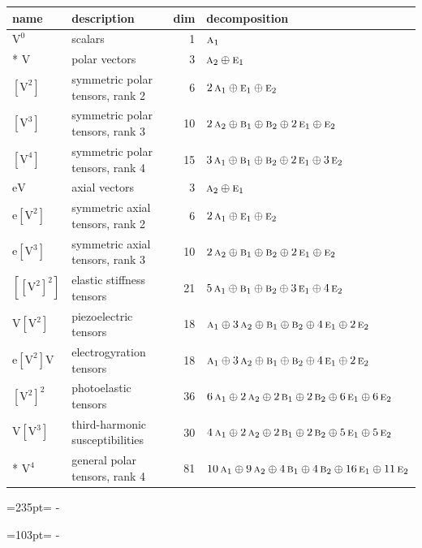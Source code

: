 \documentclass[10pt,a4paper]{article}
\newcommand{\needspace}[1]{\par\penalty-100\begingroup\dimen0=#1\relax\dimen2=\pagegoal
  \advance\dimen2-\pagetotal\ifdim\dimen0>\dimen2\relax\ifdim\dimen2>0pt\vfil\break\fi\fi
  \endgroup}
\numberwithin{equation}{section}
\newcommand{\irr}[1]{\text{\normalfont\scshape #1}}
\newcommand{\jahn}[1]{\mathrm{#1}}
\newlength{\fillwidth}\newlength{\cellwidth}\newlength{\colwidth}
\begin{document}
{\begin{longtable}{@{}llr>{\RaggedRight\arraybackslash}p{\fillwidth}@{}}
name & description & dim & decomposition\\\midrule\endhead
\bottomrule\endfoot\endlastfoot
$\jahn{V^{0}}$ & scalars & 1 & $\irr{a}_{1}$\\*
$\jahn{V}$ & polar vectors & 3 & $\irr{a}_{2} \oplus\allowbreak \irr{e}_{1}$\\
$\jahn{[V^{2}]}$ & symmetric polar tensors, rank 2 & 6 & $2\,\irr{a}_{1} \oplus\allowbreak \irr{e}_{1} \oplus\allowbreak \irr{e}_{2}$\\
$\jahn{[V^{3}]}$ & symmetric polar tensors, rank 3 & 10 & $2\,\irr{a}_{2} \oplus\allowbreak \irr{b}_{1} \oplus\allowbreak \irr{b}_{2} \oplus\allowbreak 2\,\irr{e}_{1} \oplus\allowbreak \irr{e}_{2}$\\
$\jahn{[V^{4}]}$ & symmetric polar tensors, rank 4 & 15 & $3\,\irr{a}_{1} \oplus\allowbreak \irr{b}_{1} \oplus\allowbreak \irr{b}_{2} \oplus\allowbreak 2\,\irr{e}_{1} \oplus\allowbreak 3\,\irr{e}_{2}$\\
$\jahn{eV}$ & axial vectors & 3 & $\irr{a}_{2} \oplus\allowbreak \irr{e}_{1}$\\
$\jahn{e[V^{2}]}$ & symmetric axial tensors, rank 2 & 6 & $2\,\irr{a}_{1} \oplus\allowbreak \irr{e}_{1} \oplus\allowbreak \irr{e}_{2}$\\
$\jahn{e[V^{3}]}$ & symmetric axial tensors, rank 3 & 10 & $2\,\irr{a}_{2} \oplus\allowbreak \irr{b}_{1} \oplus\allowbreak \irr{b}_{2} \oplus\allowbreak 2\,\irr{e}_{1} \oplus\allowbreak \irr{e}_{2}$\\
$\jahn{[[V^{2}]^{2}]}$ & elastic stiffness tensors & 21 & $5\,\irr{a}_{1} \oplus\allowbreak \irr{b}_{1} \oplus\allowbreak \irr{b}_{2} \oplus\allowbreak 3\,\irr{e}_{1} \oplus\allowbreak 4\,\irr{e}_{2}$\\
$\jahn{V[V^{2}]}$ & piezoelectric tensors & 18 & $\irr{a}_{1} \oplus\allowbreak 3\,\irr{a}_{2} \oplus\allowbreak \irr{b}_{1} \oplus\allowbreak \irr{b}_{2} \oplus\allowbreak 4\,\irr{e}_{1} \oplus\allowbreak 2\,\irr{e}_{2}$\\
$\jahn{e[V^{2}]V}$ & electrogyration tensors & 18 & $\irr{a}_{1} \oplus\allowbreak 3\,\irr{a}_{2} \oplus\allowbreak \irr{b}_{1} \oplus\allowbreak \irr{b}_{2} \oplus\allowbreak 4\,\irr{e}_{1} \oplus\allowbreak 2\,\irr{e}_{2}$\\
$\jahn{[V^{2}]^{2}}$ & photoelastic tensors & 36 & $6\,\irr{a}_{1} \oplus\allowbreak 2\,\irr{a}_{2} \oplus\allowbreak 2\,\irr{b}_{1} \oplus\allowbreak 2\,\irr{b}_{2} \oplus\allowbreak 6\,\irr{e}_{1} \oplus\allowbreak 6\,\irr{e}_{2}$\\
$\jahn{V[V^{3}]}$ & third-harmonic susceptibilities & 30 & $4\,\irr{a}_{1} \oplus\allowbreak 2\,\irr{a}_{2} \oplus\allowbreak 2\,\irr{b}_{1} \oplus\allowbreak 2\,\irr{b}_{2} \oplus\allowbreak 5\,\irr{e}_{1} \oplus\allowbreak 5\,\irr{e}_{2}$\\*
$\jahn{V^{4}}$ & general polar tensors, rank 4 & 81 & $10\,\irr{a}_{1} \oplus\allowbreak 9\,\irr{a}_{2} \oplus\allowbreak 4\,\irr{b}_{1} \oplus\allowbreak 4\,\irr{b}_{2} \oplus\allowbreak 16\,\irr{e}_{1} \oplus\allowbreak 11\,\irr{e}_{2}$\\
\bottomrule\end{longtable}}
\needspace{235pt}
\needspace{103pt}
\end{document}
